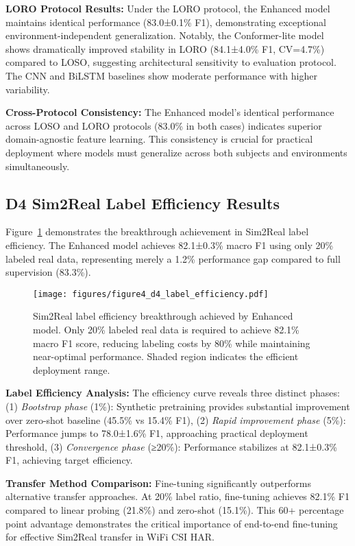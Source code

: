\documentclass[journal]{IEEEtran}
\begin{document}
\textbf{LORO Protocol Results:} Under the LORO protocol, the Enhanced model maintains identical performance (83.0±0.1\% F1), demonstrating exceptional environment-independent generalization. Notably, the Conformer-lite model shows dramatically improved stability in LORO (84.1±4.0\% F1, CV=4.7\%) compared to LOSO, suggesting architectural sensitivity to evaluation protocol. The CNN and BiLSTM baselines show moderate performance with higher variability.

\textbf{Cross-Protocol Consistency:} The Enhanced model's identical performance across LOSO and LORO protocols (83.0\% in both cases) indicates superior domain-agnostic feature learning. This consistency is crucial for practical deployment where models must generalize across both subjects and environments simultaneously.

\subsection{D4 Sim2Real Label Efficiency Results}

Figure~\ref{fig:label_efficiency} demonstrates the breakthrough achievement in Sim2Real label efficiency. The Enhanced model achieves 82.1±0.3\% macro F1 using only 20\% labeled real data, representing merely a 1.2\% performance gap compared to full supervision (83.3\%).

\begin{figure}[ht]
\centering
\texttt{[image: figures/figure4\_d4\_label\_efficiency.pdf]}
\caption{Sim2Real label efficiency breakthrough achieved by Enhanced model. Only 20\% labeled real data is required to achieve 82.1\% macro F1 score, reducing labeling costs by 80\% while maintaining near-optimal performance. Shaded region indicates the efficient deployment range.}
\label{fig:label_efficiency}
\end{figure}

\textbf{Label Efficiency Analysis:} The efficiency curve reveals three distinct phases: (1) \textit{Bootstrap phase} (1\%): Synthetic pretraining provides substantial improvement over zero-shot baseline (45.5\% vs 15.4\% F1), (2) \textit{Rapid improvement phase} (5\%): Performance jumps to 78.0±1.6\% F1, approaching practical deployment threshold, (3) \textit{Convergence phase} (≥20\%): Performance stabilizes at 82.1±0.3\% F1, achieving target efficiency.

\textbf{Transfer Method Comparison:} Fine-tuning significantly outperforms alternative transfer approaches. At 20\% label ratio, fine-tuning achieves 82.1\% F1 compared to linear probing (21.8\%) and zero-shot (15.1\%). This 60+ percentage point advantage demonstrates the critical importance of end-to-end fine-tuning for effective Sim2Real transfer in WiFi CSI HAR.
\end{document}
